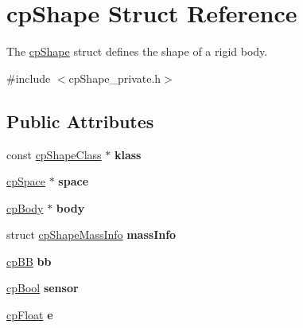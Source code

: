 \hypertarget{structcp_shape}{}\section{cp\+Shape Struct Reference}
\label{structcp_shape}


The \hyperlink{structcp_shape}{cp\+Shape} struct defines the shape of a rigid body.  




{\ttfamily \#include $<$cp\+Shape\+\_\+private.\+h$>$}

\subsection*{Public Attributes}
\begin{DoxyCompactItemize}
\item 
\hypertarget{structcp_shape_a9ad1c384f0f59b5bcb81a25b657f3966}{}const \hyperlink{structcp_shape_class}{cp\+Shape\+Class} $\ast$ {\bfseries klass}\label{structcp_shape_a9ad1c384f0f59b5bcb81a25b657f3966}

\item 
\hypertarget{structcp_shape_a74372a9f1b3ec7668acac8e3b26767b8}{}\hyperlink{structcp_space}{cp\+Space} $\ast$ {\bfseries space}\label{structcp_shape_a74372a9f1b3ec7668acac8e3b26767b8}

\item 
\hypertarget{structcp_shape_a78d93185612c5dd17ca98574250c3bbf}{}\hyperlink{structcp_body}{cp\+Body} $\ast$ {\bfseries body}\label{structcp_shape_a78d93185612c5dd17ca98574250c3bbf}

\item 
\hypertarget{structcp_shape_a1e0a12332b368de03fbb3ef89f77f317}{}struct \hyperlink{structcp_shape_mass_info}{cp\+Shape\+Mass\+Info} {\bfseries mass\+Info}\label{structcp_shape_a1e0a12332b368de03fbb3ef89f77f317}

\item 
\hypertarget{structcp_shape_a116c20032e88c91b24bc4db58fe03281}{}\hyperlink{structcp_b_b}{cp\+B\+B} {\bfseries bb}\label{structcp_shape_a116c20032e88c91b24bc4db58fe03281}

\item 
\hypertarget{structcp_shape_a313e68986b75440efbce418429ad11e3}{}\hyperlink{group__basic_types_gabc5e752c48f3449ca26ef413ecbd647e}{cp\+Bool} {\bfseries sensor}\label{structcp_shape_a313e68986b75440efbce418429ad11e3}

\item 
\hypertarget{structcp_shape_aa9c5e01e7c76b34e052a33ecb4df4df4}{}\hyperlink{group__basic_types_gac1ed65573e035bf892505768c852d8d3}{cp\+Float} {\bfseries e}\label{structcp_shape_aa9c5e01e7c76b34e052a33ecb4df4df4}


\end{DoxyCompactItemize}
